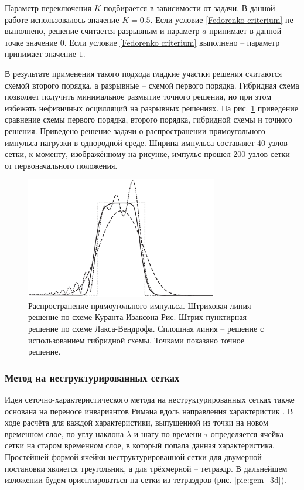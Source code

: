 Параметр переключения $K$ подбирается в зависимости от задачи. В данной работе использовалось значение $K = 0.5$. Если условие \eqref{Fedorenko criterium} не выполнено, решение считается разрывным и параметр $a$ принимает в данной точке значение $0$. Если условие \eqref{Fedorenko criterium} выполнено -- параметр принимает значение $1$.

В результате применения такого подхода гладкие участки решения считаются схемой второго порядка, а разрывные -- схемой первого порядка. Гибридная схема позволяет получить минимальное размытие точного решения, но при этом избежать нефизичных осцилляций на разрывных решениях. На рис. \ref{pic:hybrid-scheme-testing} приведение сравнение схемы первого порядка, второго порядка, гибридной схемы и точного решения. Приведено решение задачи о распространении прямоугольного импульса нагрузки в однородной среде. Ширина импульса составляет 40 узлов сетки, к моменту, изображённому на рисунке, импульс прошел 200 узлов сетки от первоначального положения.

\begin{figure}[h]
\centerline{\includegraphics[width=0.75\textwidth]{png/hybrid-scheme-testing.png}}
\caption{Распространение прямоугольного импульса. Штриховая линия -- решение по схеме Куранта-Изаксона-Рис. Штрих-пунктирная -- решение по схеме Лакса-Вендрофа. Сплошная линия -- решение с использованием гибридной схемы. Точками показано точное решение.}
\label{pic:hybrid-scheme-testing}
\end{figure}

\subsubsection{Метод на неструктурированных сетках}

Идея сеточно-характеристического метода на неструктурированных сетках также основана на переносе инвариантов Римана вдоль направления характеристик \cite{magomedov}. В ходе расчёта для каждой характеристики, выпущенной из точки на новом временном слое, по углу наклона $\lambda$ и шагу по времени $\tau$ определяется ячейка сетки на старом временном слое, в который попала данная характеристика. Простейшей формой ячейки неструктурированной сетки для двумерной постановки является треугольник, а для трёхмерной -- тетраэдр. В дальнейшем изложении будем ориентироваться на сетки из тетраэдров (рис. \ref{pic:gcm_3d}).

